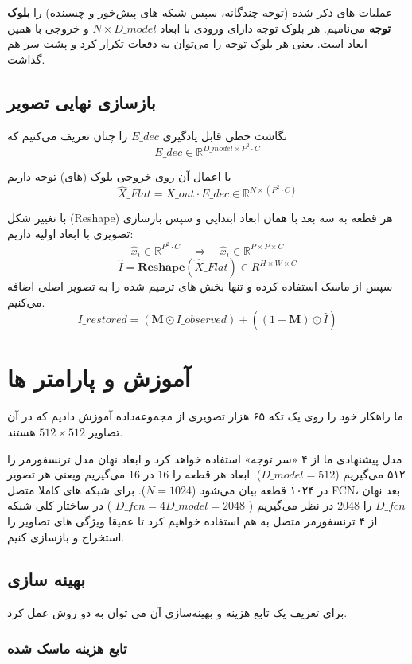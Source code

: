 عملیات های ذکر شده (توجه چندگانه، سپس شبکه های پیش‌خور و چسبنده) را \textbf{بلوک توجه} می‌نامیم. هر بلوک توجه دارای ورودی با ابعاد $ N \times D\_{model} $ و خروجی با همین ابعاد است. یعنی هر بلوک توجه را می‌توان به دفعات تکرار کرد و پشت سر هم گذاشت.

\subsection{بازسازی نهایی تصویر}
نگاشت خطی قابل یادگیری $E\_{dec}$ را چنان تعریف می‌کنیم که 
$$
E\_{dec} \in \mathbb{R}^{D\_{model} \times P^2 \cdot C}
$$

با اعمال آن روی خروجی بلوک (های) توجه داریم
$$
\hat{X}\_{Flat} = X\_{out} \cdot E\_{dec} \in \mathbb{R}^{N \times (P^2 \cdot C)}
$$

با تغییر شکل (Reshape) هر قطعه به سه بعد با همان ابعاد ابتدایی و سپس بازسازی تصویری با ابعاد اولیه داریم:
$$
\hat{x}_i \in \mathbb{R}^{P^2 \cdot C} \quad \Rightarrow \quad \hat{x}_i \in \mathbb{R}^{P \times P \times C}
$$
$$
\hat{I} = \mathbf{Reshape}(\hat{X}\_{Flat}) \in R^{H \times W \times C}
$$
سپس از ماسک استفاده کرده و تنها بخش های ترمیم شده را به تصویر اصلی اضافه می‌کنیم.
$$
I\_{restored} = (\mathbf{M} \odot I\_{observed}) + ((1-\mathbf{M}) \odot \hat{I})
$$

\section{آموزش و پارامتر ها}

ما راهکار خود را روی یک تکه ۶۵ هزار تصویری از مجموعه‌داده 
\cite{danbooru2019Portraits}
آموزش دادیم که در آن  تصاویر $ 512 \times 512 $ هستند. 

مدل پیشنهادی ما از ۴‌ «سر توجه» استفاده خواهد کرد و ابعاد نهان مدل ترنسفورمر را ۵۱۲ می‌گیریم ($D\_{model} = 512 $). ابعاد هر قطعه را 16 در 16 می‌گیریم ویعنی هر تصویر در ۱۰۲۴ قطعه بیان می‌شود ($N = 1024 $).
برای شبکه های کاملا متصل FCN، بعد نهان $D\_{fcn}$ را  2048 در نظر می‌گیریم (
$D\_{fcn}  = 4 D\_{model} = 2048$
)
در ساختار کلی شبکه از ۴ ترنسفورمر متصل به هم استفاده خواهیم کرد تا عمیقا ویژگی های تصاویر را استخراج و بازسازی کنیم.

\subsection{بهینه سازی}
برای تعریف یک تابع هزینه و بهینه‌سازی آن می توان به دو روش عمل کرد.

\subsubsection{تابع هزینه  ماسک شده}

